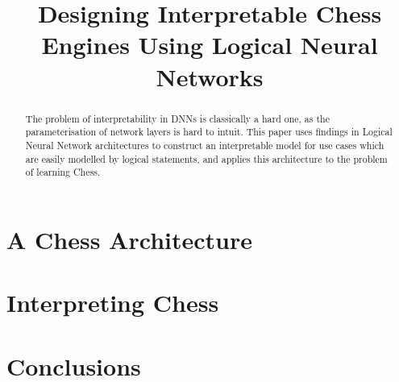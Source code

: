 \documentclass[conference]{report}
\begin{document}
\def\T{\textbf{T}}
\def\F{\textbf{F}}
\def\NOT{\texttt{NOT}}
\def\AND{\texttt{AND}}
\def\OR{\texttt{OR}}
\def\XOR{\texttt{XOR}}
\def\R{\mathbb{R}}
\def\B{\mathbb{B}}
\def\N{\mathbb{N}}

\def\custop#1{{\mspace{4mu}#1\mspace{4mu}}}
\def\concat{\custop{@}}

\title{\LARGE Designing Interpretable Chess Engines Using Logical Neural Networks}

\maketitle
\thispagestyle{plain}
\pagestyle{plain}

\begin{abstract}
The problem of interpretability in DNNs is classically a hard one, as the parameterisation of network layers is hard to intuit. This paper uses findings in Logical Neural Network architectures to construct an interpretable model for use cases which are easily modelled by logical statements, and applies this architecture to the problem of learning Chess.  
\end{abstract}

\tableofcontents

\pagebreak


 


\chapter{A Chess Architecture}

\chapter{Interpreting Chess}

\chapter{Conclusions}
 
\end{document}
